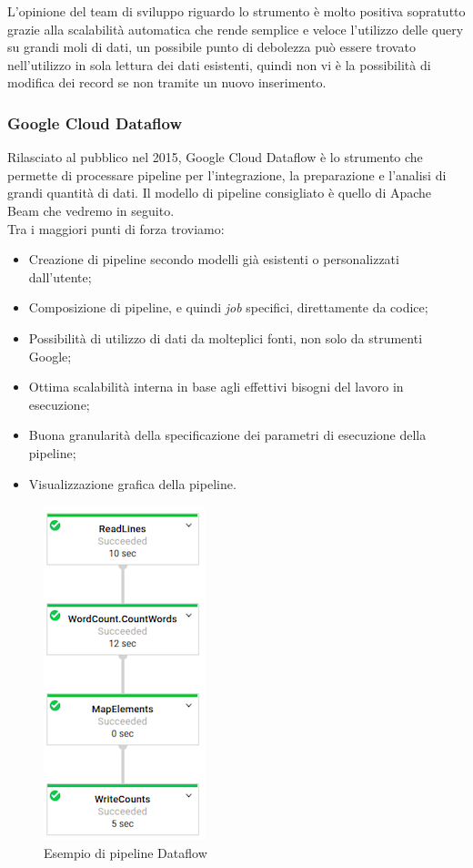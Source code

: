 L'opinione del team di sviluppo riguardo lo strumento è molto positiva sopratutto grazie alla scalabilità automatica che rende semplice e veloce l'utilizzo delle query su grandi moli di dati, un possibile punto di debolezza può essere trovato nell'utilizzo in sola lettura dei dati esistenti, quindi non vi è la possibilità di modifica dei record se non tramite un nuovo inserimento.
\subsubsection{Google Cloud Dataflow}
Rilasciato al pubblico nel 2015, Google Cloud Dataflow è lo strumento che permette di processare pipeline per l'integrazione, la preparazione e l'analisi di grandi quantità di dati.
Il modello di pipeline consigliato è quello di Apache Beam che vedremo in seguito.
\\ Tra i maggiori punti di forza troviamo:
\begin{itemize}
	\item Creazione di pipeline secondo modelli già esistenti o personalizzati dall'utente;
	\item Composizione di pipeline, e quindi \emph{job} specifici, direttamente da codice;
	\item Possibilità di utilizzo di dati da molteplici fonti, non solo da strumenti Google;
	\item Ottima scalabilità interna in base agli effettivi bisogni del lavoro in esecuzione;
	\item Buona granularità della specificazione dei parametri di esecuzione\cite{parametridiesecuzione} della pipeline;
	\item Visualizzazione grafica della pipeline. 
\end{itemize}

\begin{figure}[h!]
	\centering
	\includegraphics[scale=1]{figures/dataflow-job-full}
	\caption[Esempio di pipeline dataflow.]{Esempio di pipeline Dataflow
		\label{fig:pipelinedataflow}}
\end{figure}	
\pagebreak

